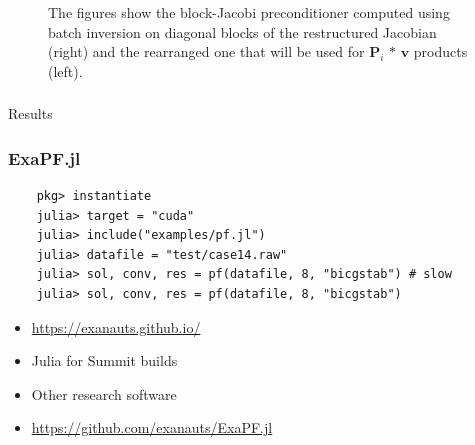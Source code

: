 \begin{frame}
\begin{figure}
{
  }
  \caption{The figures show the block-Jacobi preconditioner computed using batch inversion on diagonal blocks of the restructured Jacobian (right) and the rearranged one that will be used for $\bm{P}_i\,*\,\bm{v}$ products (left).}
  \label{fig:spyP}
\end{figure}

\begin{frame}
  \frametitle{}
  \centering
  {\Huge Results}
\end{frame}

\begin{frame}[fragile]
  \frametitle{ExaPF.jl}
  \begin{lstlisting}
    pkg> instantiate
    julia> target = "cuda" 
    julia> include("examples/pf.jl") 
    julia> datafile = "test/case14.raw"
    julia> sol, conv, res = pf(datafile, 8, "bicgstab") # slow
    julia> sol, conv, res = pf(datafile, 8, "bicgstab")
  \end{lstlisting}
  \begin{itemize}
    \item \url{https://exanauts.github.io/}
    \item Julia for Summit builds
    \item Other research software
    \item \url{https://github.com/exanauts/ExaPF.jl}
  \end{itemize}
\end{frame}


\end{frame}
